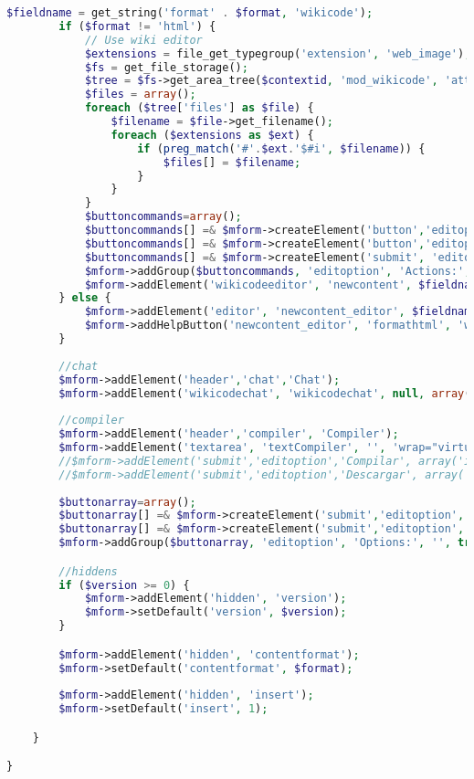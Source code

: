 \begin{lstlisting}[language=PHP]
        $fieldname = get_string('format' . $format, 'wikicode');
        if ($format != 'html') {
            // Use wiki editor
            $extensions = file_get_typegroup('extension', 'web_image');
            $fs = get_file_storage();
            $tree = $fs->get_area_tree($contextid, 'mod_wikicode', 'attachments', $fileitemid);
            $files = array();
            foreach ($tree['files'] as $file) {
                $filename = $file->get_filename();
                foreach ($extensions as $ext) {
                    if (preg_match('#'.$ext.'$#i', $filename)) {
                        $files[] = $filename;
                    }
                }
            }
			$buttoncommands=array();
			$buttoncommands[] =& $mform->createElement('button','editoption','Unlock', array('id' => 'btnunlock', 'class' => 'btnunlock'));
			$buttoncommands[] =& $mform->createElement('button','editoption','Refresh', array('id' => 'btnref', 'class' => 'btnref'));
			$buttoncommands[] =& $mform->createElement('submit', 'editoption', 'Save', array('id' => 'save'));
			$mform->addGroup($buttoncommands, 'editoption', 'Actions:', '', true);
            $mform->addElement('wikicodeeditor', 'newcontent', $fieldname, array('cols' => 150, 'rows' => 30, 'Wiki_format' => $format, 'files'=>$files));
        } else {
            $mform->addElement('editor', 'newcontent_editor', $fieldname, null, page_wikicode_edit::$attachmentoptions);
            $mform->addHelpButton('newcontent_editor', 'formathtml', 'wikicode');
        }
		
		//chat
		$mform->addElement('header','chat','Chat');
		$mform->addElement('wikicodechat', 'wikicodechat', null, array('itemid'=>$fileitemid));
		
		//compiler
		$mform->addElement('header','compiler', 'Compiler');
		$mform->addElement('textarea', 'textCompiler', '', 'wrap="virtual" rows="3" cols="150" readonly="readonly" ');
		//$mform->addElement('submit','editoption','Compilar', array('id' => 'compile'));
		//$mform->addElement('submit','editoption','Descargar', array('id' => 'download'));
		
		$buttonarray=array();
		$buttonarray[] =& $mform->createElement('submit','editoption','Compile', array('id' => 'compile'));
		$buttonarray[] =& $mform->createElement('submit','editoption','Download', array('id' => 'compile'));
		$mform->addGroup($buttonarray, 'editoption', 'Options:', '', true);

        //hiddens
        if ($version >= 0) {
            $mform->addElement('hidden', 'version');
            $mform->setDefault('version', $version);
        }

        $mform->addElement('hidden', 'contentformat');
        $mform->setDefault('contentformat', $format);
		
		$mform->addElement('hidden', 'insert');
		$mform->setDefault('insert', 1);

    }

}
\end{lstlisting}


